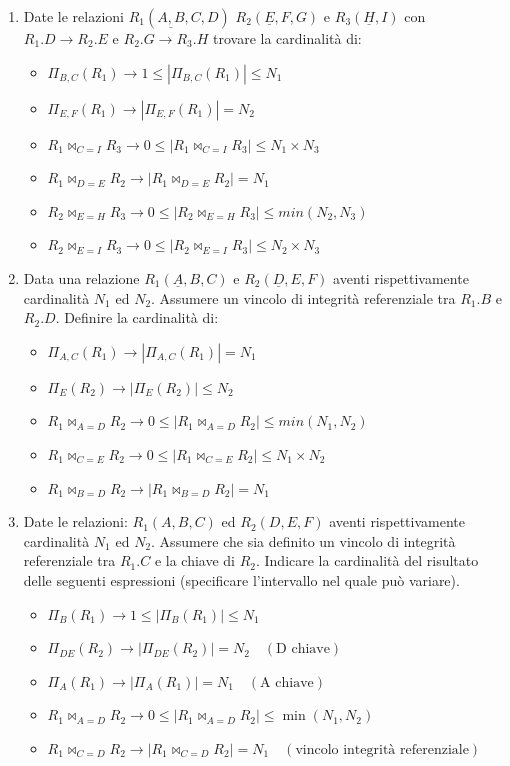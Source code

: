 \documentclass{article}
\begin{document}
\begin{enumerate}
	\item Date le relazioni $R_1(\underline{A,B}, C, D)$ $R_2(\underline{E},F,G)$ e $R_3(\underline{H},I)$ con $R_1.D \rightarrow R_2.E$ e $R_2.G \rightarrow R_3.H$ trovare la cardinalità di:\begin{itemize}
		\item $\Pi_{B,C}(R_1) \rightarrow 1 \leq | \Pi_{B,C}(R_1) | \leq N_1$
		\item $\Pi_{E,F}(R_1) \rightarrow | \Pi_{E,F}(R_1) | = N_2$
		\item $R_1 \bowtie_{C = I}R_3 \rightarrow 0 \leq | R_1 \bowtie_{C = I}R_3 | \leq N_1 \times N_3$
		\item $R_1 \bowtie_{D = E}R_2 \rightarrow |R_1 \bowtie_{D = E}R_2| = N_1 $
		\item $R_2 \bowtie_{E = H}R_3 \rightarrow 0 \leq | R_2 \bowtie_{E = H}R_3 | \leq min(N_2,N_3)$
		\item $R_2 \bowtie_{E = I}R_3 \rightarrow 0 \leq | R_2 \bowtie_{E = I}R_3 | \leq N_2 \times N_3$
	\end{itemize}
	
	\item Data una relazione $R_1(\underline{A},B,C)$ e $R_2(\underline{D},E,F)$ aventi rispettivamente cardinalità $N_1$ ed $N_2$. Assumere un vincolo di integrità referenziale tra $R_1.B$ e $R_2.D$. Definire la cardinalità di: \begin{itemize}
		\item $\Pi_{A,C}(R_1) \rightarrow |\Pi_{A,C}(R_1)| = N_1$
		\item $\Pi_{E}(R_2) \rightarrow |\Pi_{E}(R_2)| \leq N_2$
		\item $R_1 \bowtie_{A=D} R_2 \rightarrow 0 \leq | R_1 \bowtie_{A=D} R_2 | \leq min(N_1,N_2)$
		\item $R_1 \bowtie_{C=E} R_2 \rightarrow 0 \leq |R_1 \bowtie_{C=E} R_2| \leq N_1 \times N_2$
		\item $R_1 \bowtie_{B = D} R_2 \rightarrow |R_1 \bowtie_{B=D} R_2| = N_1$
		
	\end{itemize}

\item Date le relazioni: $R_1(A, B, C)$ ed $R_2(D, E, F)$ aventi rispettivamente cardinalità $N_1$ ed $N_2$. Assumere che sia definito un vincolo di integrità referenziale tra $R_1.C$ e la chiave di $R_2$. Indicare la cardinalità del risultato delle seguenti espressioni (specificare l’intervallo nel quale può variare).
\begin{itemize}
	\item $\Pi_B (R_1) \rightarrow 1 \leq |\Pi_B (R_1)| \leq N_1$
	\item $\Pi_{DE} (R_2) \rightarrow |\Pi_{DE} (R_2)| = N_2 \quad (\text{D chiave})$
	\item $\Pi_A (R_1) \rightarrow |\Pi_A (R_1)| = N_1 \quad (\text{A chiave})$
	\item $R_1 \bowtie_{A=D} R_2 \rightarrow 0 \leq |R_1 \bowtie_{A=D} R_2| \leq \min(N_1, N_2)$
	\item $R_1 \bowtie_{C=D} R_2 \rightarrow |R_1 \bowtie_{C=D} R_2| = N_1 \quad (\text{vincolo integrità referenziale})$
\end{itemize}


\end{enumerate}
\end{document}
